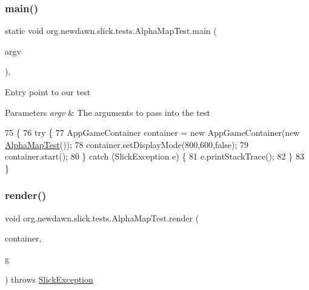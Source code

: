 \subsubsection{\texorpdfstring{main()}{main()}}
{\footnotesize\ttfamily static void org.\+newdawn.\+slick.\+tests.\+Alpha\+Map\+Test.\+main (\begin{DoxyParamCaption}\item[{String \mbox{[}$\,$\mbox{]}}]{argv }\end{DoxyParamCaption})\hspace{0.3cm}{\ttfamily [inline]}, {\ttfamily [static]}}

Entry point to our test


\begin{DoxyParams}{Parameters}
{\em argv} & The arguments to pass into the test \\
\hline
\end{DoxyParams}

\begin{DoxyCode}
75                                            \{
76         \textcolor{keywordflow}{try} \{
77             AppGameContainer container = \textcolor{keyword}{new} AppGameContainer(\textcolor{keyword}{new} \mbox{\hyperlink{classorg_1_1newdawn_1_1slick_1_1tests_1_1_alpha_map_test_a2b9c7ee910b1bd0c590f169936e535e7}{AlphaMapTest}}());
78             container.setDisplayMode(800,600,\textcolor{keyword}{false});
79             container.start();
80         \} \textcolor{keywordflow}{catch} (SlickException e) \{
81             e.printStackTrace();
82         \}
83     \}
\end{DoxyCode}
\mbox{\label{classorg_1_1newdawn_1_1slick_1_1tests_1_1_alpha_map_test_a11802d19ba7c484c9db38366c96c857e}} 
\subsubsection{\texorpdfstring{render()}{render()}}
{\footnotesize\ttfamily void org.\+newdawn.\+slick.\+tests.\+Alpha\+Map\+Test.\+render (\begin{DoxyParamCaption}\item[{\mbox{\hyperlink{classorg_1_1newdawn_1_1slick_1_1_game_container}{Game\+Container}}}]{container,  }\item[{\mbox{\hyperlink{classorg_1_1newdawn_1_1slick_1_1_graphics}{Graphics}}}]{g }\end{DoxyParamCaption}) throws \mbox{\hyperlink{classorg_1_1newdawn_1_1slick_1_1_slick_exception}{Slick\+Exception}}\hspace{0.3cm}{\ttfamily [inline]}}

